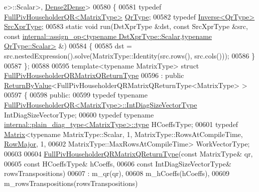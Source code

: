 \begin{DoxyCode}
      e>::Scalar>, \hyperlink{struct_eigen_1_1internal_1_1_dense2_dense}{Dense2Dense}>
00580 \{
00581   \textcolor{keyword}{typedef} \hyperlink{group___q_r___module}{FullPivHouseholderQR<MatrixType>} 
      \hyperlink{group___q_r___module}{QrType};
00582   \textcolor{keyword}{typedef} \hyperlink{class_eigen_1_1_inverse}{Inverse<QrType>} \hyperlink{class_eigen_1_1_inverse}{SrcXprType};
00583   \textcolor{keyword}{static} \textcolor{keywordtype}{void} run(DstXprType &dst, \textcolor{keyword}{const} SrcXprType &src, \textcolor{keyword}{const} 
      \hyperlink{struct_eigen_1_1internal_1_1assign__op}{internal::assign\_op<typename DstXprType::Scalar,typename QrType::Scalar>}
       &)
00584   \{    
00585     dst = src.nestedExpression().solve(MatrixType::Identity(src.rows(), src.cols()));
00586   \}
00587 \};
00588 
00595 \textcolor{keyword}{template}<\textcolor{keyword}{typename} MatrixType> \textcolor{keyword}{struct }\hyperlink{group___q_r___module_struct_eigen_1_1internal_1_1_full_piv_householder_q_r_matrix_q_return_type}{FullPivHouseholderQRMatrixQReturnType}
00596   : \textcolor{keyword}{public} \hyperlink{group___core___module_class_eigen_1_1_return_by_value}{ReturnByValue}<FullPivHouseholderQRMatrixQReturnType<MatrixType> >
00597 \{
00598 \textcolor{keyword}{public}:
00599   \textcolor{keyword}{typedef} \textcolor{keyword}{typename} \hyperlink{group___q_r___module_class_eigen_1_1_full_piv_householder_q_r}{FullPivHouseholderQR<MatrixType>::IntDiagSizeVectorType}
       IntDiagSizeVectorType;
00600   \textcolor{keyword}{typedef} \textcolor{keyword}{typename} \hyperlink{class_eigen_1_1internal_1_1_tensor_lazy_evaluator_writable}{internal::plain\_diag\_type<MatrixType>::type} 
      HCoeffsType;
00601   \textcolor{keyword}{typedef} \hyperlink{group___core___module_class_eigen_1_1_matrix}{Matrix}<\textcolor{keyword}{typename} MatrixType::Scalar, 1, MatrixType::RowsAtCompileTime, 
      \hyperlink{group__enums_ggaacded1a18ae58b0f554751f6cdf9eb13acfcde9cd8677c5f7caf6bd603666aae3}{RowMajor}, 1,
00602                  MatrixType::MaxRowsAtCompileTime> WorkVectorType;
00603 
00604   \hyperlink{group___q_r___module_struct_eigen_1_1internal_1_1_full_piv_householder_q_r_matrix_q_return_type}{FullPivHouseholderQRMatrixQReturnType}(\textcolor{keyword}{const} MatrixType&       qr,
00605                                         \textcolor{keyword}{const} HCoeffsType&      hCoeffs,
00606                                         \textcolor{keyword}{const} IntDiagSizeVectorType& rowsTranspositions)
00607     : m\_qr(qr),
00608       m\_hCoeffs(hCoeffs),
00609       m\_rowsTranspositions(rowsTranspositions)

\end{DoxyCode}
